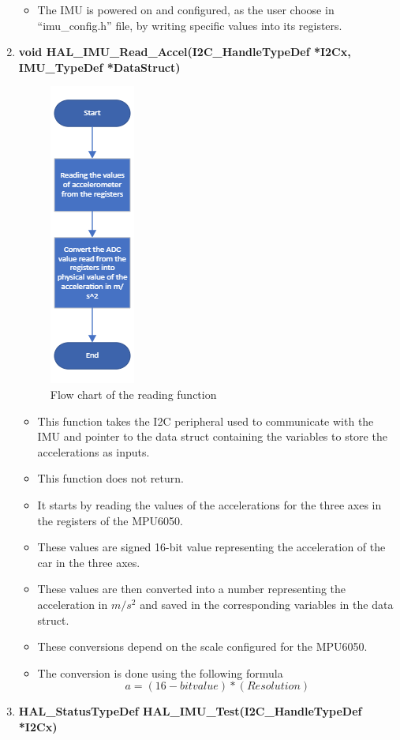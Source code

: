 \begin{enumerate}
\begin{itemize}
    \item The IMU is powered on and configured, as the user choose in “imu\_config.h” file, by writing specific values into its registers.
    \end{itemize}
    \item \textbf{void HAL\_IMU\_Read\_Accel(I2C\_HandleTypeDef *I2Cx, IMU\_TypeDef *DataStruct)}
    \begin{figure}[h]
    \centering
    \includegraphics{figure/5-4.png}
    \caption{Flow chart of the reading function}
\end{figure}
    \begin{itemize}
        \item This function takes the I2C peripheral used to communicate with the IMU and pointer to the data struct containing the variables to store the accelerations as inputs.
        \item This function does not return.
        \item It starts by reading the values of the accelerations for the three axes in the registers of the MPU6050.
        \item These values are signed 16-bit value representing the acceleration of the car in the three axes.
        \item These values are then converted into a number representing the acceleration in $m/s^2$ and saved in the corresponding variables in the data struct.
        \item These conversions depend on the scale configured for the MPU6050.
        \item The conversion is done using the following formula
        \[ a = (16 - bit value) * (Resolution)\]
    \end{itemize}
    \item \textbf{HAL\_StatusTypeDef HAL\_IMU\_Test(I2C\_HandleTypeDef *I2Cx)}
    

\end{enumerate}

